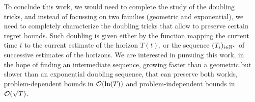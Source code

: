 To conclude this work, we would need to complete the study of the doubling tricks, and instead of focussing on two families (geometric and exponential), we need to completely characterize the doubling tricks that allow to preserve certain regret bounds.
Such doubling is given either by the function mapping the current time $t$ to the current estimate of the horizon $T(t)$, or the sequence $(T_i)_{i\in\mathbb{N}^*}$ of successive estimates of the horizons.
We are interested in pursuing this work, in the hope of finding an intermediate sequence, growing faster than a geometric but slower than an exponential doubling sequence, that can preserve both worlds, problem-dependent bounds in $\mathcal{O}(\ln(T))$ and problem-independent bounds in $\mathcal{O}(\sqrt{T})$.
